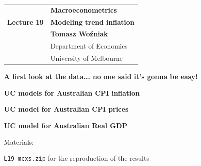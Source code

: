 \documentclass[notes,blackandwhite,mathsans,usenames,dvipsnames]{beamer}
\begin{document}







{
\begin{frame}

\vspace{1cm}
\begin{tabular}{rl}
&\textbf{\LARGE\color{mcxs2} Macroeconometrics}\\[8ex]
\textbf{\Large Lecture 19}&\textbf{\Large\color{mcxs3}Modeling trend inflation}\\[19ex]
&\textbf{Tomasz Wo\'zniak}\\[1ex]
&{\small\color{mcxs3} Department of Economics}\\
&{\small\color{mcxs3}University of Melbourne}
\end{tabular}

\end{frame}
}




{
\begin{frame}

\vspace{1cm}\textbf{\color{mcxs2}A first look at the data... no one said it's gonna be easy!}

\bigskip\textbf{\color{mcxs2}UC models for Australian CPI inflation}

\bigskip\textbf{\color{mcxs2}UC model for Australian CPI prices}

\bigskip\textbf{\color{mcxs1}UC model for Australian Real GDP}

%

\normalsize
\vspace{1cm} Materials: \scriptsize

 \texttt{L19 mcxs.zip} {\color{mcxs2}for the reproduction of the results}

\end{frame}
}
\end{document}
